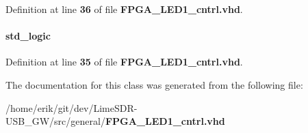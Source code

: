Definition at line {\bf 36} of file {\bf F\+P\+G\+A\+\_\+\+L\+E\+D1\+\_\+cntrl.\+vhd}.

\paragraph[{led\+\_\+r\+\_\+ovr}]{ {\bfseries \textcolor{comment}{std\+\_\+logic}\textcolor{vhdlchar}{ }} \hspace{0.3cm}{\ttfamily [Signal]}}\label{classFPGA__LED1__cntrl_1_1arch_a67886c5045d27f249f9daa43213ebecd}


Definition at line {\bf 35} of file {\bf F\+P\+G\+A\+\_\+\+L\+E\+D1\+\_\+cntrl.\+vhd}.



The documentation for this class was generated from the following file\+:\begin{DoxyCompactItemize}
\item 
/home/erik/git/dev/\+Lime\+S\+D\+R-\/\+U\+S\+B\+\_\+\+G\+W/src/general/{\bf F\+P\+G\+A\+\_\+\+L\+E\+D1\+\_\+cntrl.\+vhd}\end{DoxyCompactItemize}
